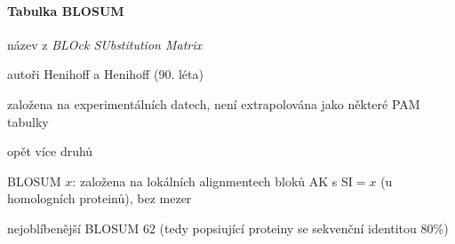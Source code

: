 \documentclass[DIV=8]{scrreprt}
\begin{document}
\paragraph{Tabulka BLOSUM}
\begin{myItemize}[nosep]
    \item název z \emph{BLOck SUbstitution Matrix}
    \item autoři Henihoff a Henihoff (90. léta)
    \item založena na experimentálních datech, není extrapolována jako některé PAM tabulky
    \item opět více druhů
\begin{myItemize}[nosep]
    \item BLOSUM \(x\): založena na lokálních alignmentech bloků AK s \(\text{SI}=x\) (u homologních proteinů), bez mezer
    \item nejoblíbenější BLOSUM 62 (tedy popsiující proteiny se sekvenční identitou 80\%)
\end{myItemize}

\end{myItemize}
\end{document}
